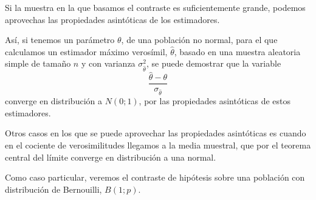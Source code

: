 Si la muestra en la que basamos el contraste es suficientemente grande, podemos aprovechas las propiedades asint\'oticas de los estimadores.

As\'i, si tenemos un par\'ametro $\theta$, de una poblaci\'on no normal, para el que calculamos un estimador m\'aximo veros\'imil, $\hat{\theta}$, basado en una muestra aleatoria simple de tama\~no $n$ y con varianza $\sigma_{\hat{\theta}}^2$, se puede demostrar que la variable
\[\dfrac{\hat{\theta}-\theta}{\sigma_{\hat{\theta}}}\]
converge en distribuci\'on a $N(0;1)$, por las propiedades asint\'oticas de estos estimadores.

Otros casos en los que se puede aprovechar las propiedades asint\'oticas es cuando en el cociente de verosimilitudes llegamos a la media muestral, que por el teorema central del l\'imite converge en distribuci\'on a una normal.


Como caso particular, veremos el contraste de hip\'otesis sobre una poblaci\'on con distribuci\'on de Bernouilli, $B(1;p)$.


